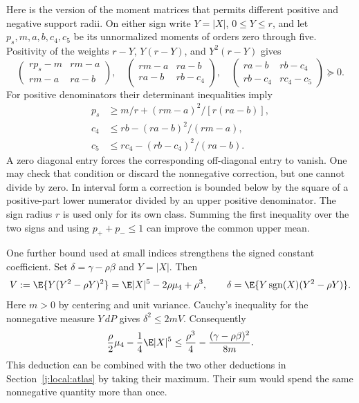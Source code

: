 Here is the version of the moment matrices that permits different
positive and negative support radii. On either sign write $Y=|X|$,
$0\le Y\le r$, and let $p_s,m,a,b,c_4,c_5$ be its unnormalized
moments of orders zero through five. Positivity of the weights
$r-Y$, $Y(r-Y)$, and $Y^2(r-Y)$ gives
\[
 \begin{pmatrix}rp_s-m&rm-a\\rm-a&ra-b\end{pmatrix},\quad
 \begin{pmatrix}rm-a&ra-b\\ra-b&rb-c_4\end{pmatrix},\quad
 \begin{pmatrix}ra-b&rb-c_4\\rb-c_4&rc_4-c_5\end{pmatrix}
 \succeq0.
\]
For positive denominators their determinant inequalities imply
\begin{align*}
 p_s&\ge m/r+(rm-a)^2/[r(ra-b)],\\
 c_4&\le rb-(ra-b)^2/(rm-a),\\
 c_5&\le rc_4-(rb-c_4)^2/(ra-b).
\end{align*}
A zero diagonal entry forces the corresponding off-diagonal entry to
vanish. One may check that condition or discard the nonnegative
correction, but one cannot divide by zero. In interval form a correction
is bounded below by the square of a positive-part lower numerator
divided by an upper positive denominator. The sign radius $r$ is used
only for its own class. Summing the first inequality over the two signs
and using $p_++p_-\le1$ can improve the common upper mean.

One further bound used at small indices strengthens the signed constant
coefficient. Set $\delta=\gamma-\rho\beta$ and $Y=|X|$. Then
\[
 V:=\E\{Y(Y^2-\rho Y)^2\}
   =\E|X|^5-2\rho\mu_4+\rho^3,
 \qquad
 \delta=\E\{Y\operatorname{sgn}(X)(Y^2-\rho Y)\}.
\]
Here $m>0$ by centering and unit variance.
Cauchy's inequality for the nonnegative measure $Y\,dP$ gives
$\delta^2\le2mV$. Consequently
\begin{equation}\label{j:local:ext:weighted-cubic-loss}
 \frac\rho2\mu_4-\frac14\E|X|^5
 \le\frac{\rho^3}{4}-\frac{(\gamma-\rho\beta)^2}{8m}.
\end{equation}
This deduction can be combined with the two other deductions in
Section~\ref{j:local:atlas} by taking their maximum. Their sum would spend
the same nonnegative quantity more than once.



